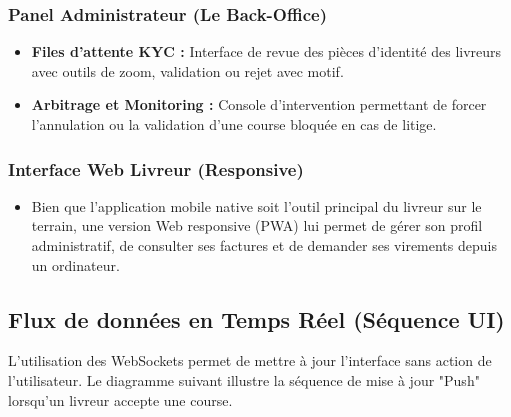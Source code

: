 \subsubsection{Panel Administrateur (Le Back-Office)}
\begin{itemize}
    \item \textbf{Files d'attente KYC :} Interface de revue des pièces d'identité des livreurs avec outils de zoom, validation ou rejet avec motif.
    \item \textbf{Arbitrage et Monitoring :} Console d'intervention permettant de forcer l'annulation ou la validation d'une course bloquée en cas de litige.
\end{itemize}

\subsubsection{Interface Web Livreur (Responsive)}
\begin{itemize}
    \item Bien que l'application mobile native soit l'outil principal du livreur sur le terrain, une version Web responsive (PWA) lui permet de gérer son profil administratif, de consulter ses factures et de demander ses virements depuis un ordinateur.
\end{itemize}

\subsection{Flux de données en Temps Réel (Séquence UI)}

L'utilisation des WebSockets permet de mettre à jour l'interface sans action de l'utilisateur. Le diagramme suivant illustre la séquence de mise à jour "Push" lorsqu'un livreur accepte une course.

